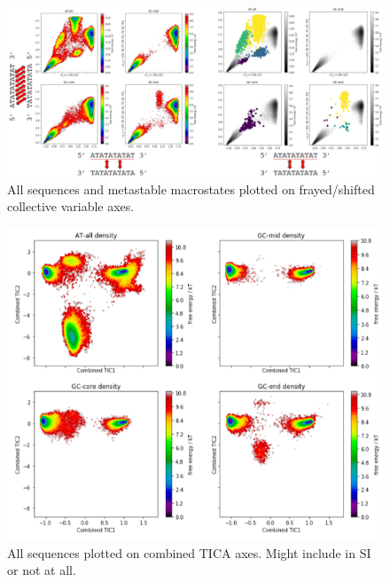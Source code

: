 \documentclass[journal=jpcbfk,manuscript=article]{achemso}
\begin{document}
\begin{figure}[ht!]
	\begin{center}
        \includegraphics[width=\textwidth]{Figs/figs_0804/all_seq_physical_cvs_labels.PNG}
        \caption{All sequences and metastable macrostates plotted on frayed/shifted collective variable axes.}
        \label{fig:all_seq_physical_cvs_labels}
	\end{center}
\end{figure}

\begin{figure}[ht!]
	\begin{center}
        \includegraphics[width=\textwidth]{Figs/figs_0804/all_seq_tica_cvs.PNG}
        \caption{All sequences plotted on combined TICA axes. Might include in SI or not at all.}
        \label{fig:all_seq_tica_cvs}
	\end{center}
\end{figure}
\end{document}
